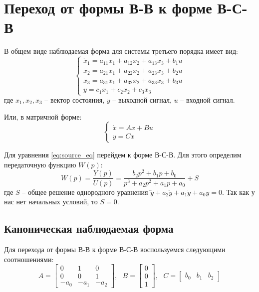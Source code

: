 \section{Переход от формы В-В к форме В-С-В}

В общем виде наблюдаемая форма для системы третьего порядка имеет вид:
\begin{equation}
    \begin{cases}
        \dot{x}_1 = a_{11} x_1 + a_{12} x_2 + a_{13} x_3 + b_1 u \\
        \dot{x}_2 = a_{21} x_1 + a_{22} x_2 + a_{23} x_3 + b_2 u \\
        \dot{x}_3 = a_{31} x_1 + a_{32} x_2 + a_{33} x_3 + b_3 u \\
        y = c_1 x_1 + c_2 x_2 + c_3 x_3
    \end{cases}
\end{equation}
где $x_1, x_2, x_3$ -- вектор состояния, $y$ -- выходной сигнал, $u$ -- входной сигнал.

Или, в матричной форме:
\begin{equation}
    \begin{cases}
        \dot{x} = Ax + Bu \\
        y = Cx
    \end{cases}
\end{equation}

Для уравнения \ref{eq:source_eq} перейдем к форме В-С-В. Для этого определим передаточную функцию $W(p)$:
\begin{equation}
    W(p) = \frac{Y(p)}{U(p)} = \frac{b_2 p^2 + b_1 p + b_0}{p^3 + a_2 p^2 + a_1 p + a_0} + S
\end{equation}
где $S$ -- общее решение однородного уравнения $\dddot{y} + a_2\ddot{y} + a_1\dot{y} + a_0y = 0$. Так как у нас нет начальных условий, то $S = 0$.

\subsection{Каноническая наблюдаемая форма}

Для перехода от формы В-В к форме В-С-В воспользуемся следующими соотношениями:
\begin{equation}
    A = \begin{bmatrix}
        0 & 1 & 0 \\
        0 & 0 & 1 \\
        -a_0 & -a_1 & -a_2
    \end{bmatrix},~~~
    B = \begin{bmatrix}
        0 \\
        0 \\
        1
    \end{bmatrix},~~~
    C = \begin{bmatrix}
        b_0 & b_1 & b_2
    \end{bmatrix}
\end{equation}

